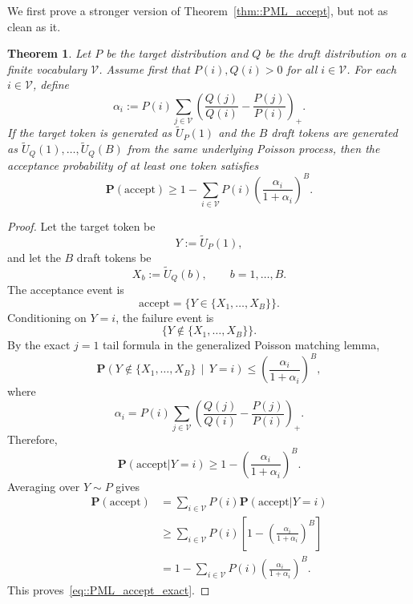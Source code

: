 \documentclass{article}
\theoremstyle{plain}
\newtheorem{theorem}{Theorem}[section]
\theoremstyle{definition}
\begin{document}
\subsubsection{}

We first prove a stronger version of  Theorem~\ref{thm::PML_accept}, but not as clean as it. 


\begin{theorem}
\label{thm::PML_accept_exact}
Let $P$ be the target distribution and $Q$ be the draft distribution on a finite
vocabulary $\mathcal V$. Assume first that $P(i),Q(i)>0$ for all
$i\in\mathcal V$. For each $i\in\mathcal V$, define
\[
    \alpha_i
    :=
    P(i)\sum_{j\in\mathcal V}
    \left(
        \frac{Q(j)}{Q(i)}-\frac{P(j)}{P(i)}
    \right)_+ .
\]
If the target token is generated as $\tilde U_P(1)$ and the $B$ draft tokens are
generated as $\tilde U_Q(1),\ldots,\tilde U_Q(B)$ from the same underlying
Poisson process, then the acceptance probability of at least one token satisfies
\begin{equation}
    \label{eq::PML_accept_exact}
    \mathbf P(\mathrm{accept})
    \ge
    1-\sum_{i\in\mathcal V}
    P(i)
    \left(
        \frac{\alpha_i}{1+\alpha_i}
    \right)^B .
\end{equation}
\end{theorem}



\begin{proof}
Let the target token be
\[
    Y:=\tilde U_P(1),
\]
and let the $B$ draft tokens be
\[
    X_b:=\tilde U_Q(b),\qquad b=1,\ldots,B.
\]
The acceptance event is
\[
    \mathrm{accept}
    =
    \{Y\in\{X_1,\ldots,X_B\}\}.
\]
Conditioning on $Y=i$, the failure event is
\[
    \{Y\notin\{X_1,\ldots,X_B\}\}.
\]
By the exact $j=1$ tail formula in the generalized Poisson matching lemma,
\[
    \mathbf P\!\left(
        Y\notin\{X_1,\ldots,X_B\}
        \,\middle|\, Y=i
    \right)
    \le
    \left(
        \frac{\alpha_i}{1+\alpha_i}
    \right)^B,
\]
where
\[
    \alpha_i
    =
    P(i)\sum_{j\in\mathcal V}
    \left(
        \frac{Q(j)}{Q(i)}-\frac{P(j)}{P(i)}
    \right)_+ .
\]
Therefore,
\[
    \mathbf P(\mathrm{accept}| Y=i)
    \ge
    1-
    \left(
        \frac{\alpha_i}{1+\alpha_i}
    \right)^B .
\]
Averaging over $Y\sim P$ gives
\[
\begin{aligned}
    \mathbf P(\mathrm{accept})
    &=
    \sum_{i\in\mathcal V} P(i)
    \mathbf P(\mathrm{accept}| Y=i)\\
    &\ge
    \sum_{i\in\mathcal V} P(i)
    \left[
        1-
        \left(
            \frac{\alpha_i}{1+\alpha_i}
        \right)^B
    \right]\\
    &=
    1-\sum_{i\in\mathcal V}
    P(i)
    \left(
        \frac{\alpha_i}{1+\alpha_i}
    \right)^B .
\end{aligned}
\]
This proves~\eqref{eq::PML_accept_exact}.
\end{proof}
\end{document}
